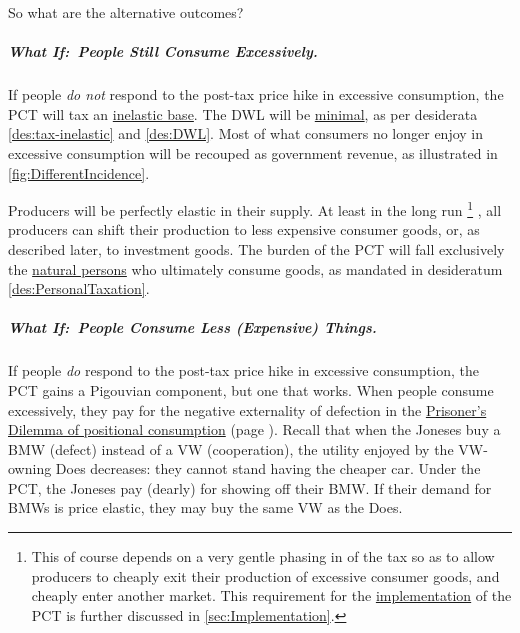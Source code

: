 So what are the alternative outcomes?

\subparagraph{What If:~People Still Consume Excessively.} If people \emph{do not} respond to the post-tax price hike in excessive consumption, the PCT will tax an \hyperref[des:tax-inelastic]{inelastic base}.
The DWL will be \hyperref[des:DWL]{minimal}, as per desiderata \ref{des:tax-inelastic} and \ref{des:DWL}.
Most of what consumers no longer enjoy in excessive consumption will be recouped as government revenue, as illustrated in \autoref{fig:DifferentIncidence}.

Producers will be perfectly elastic in their supply.
At least in the long run
\footnote{
	This of course depends on a very gentle phasing in of the tax so as to allow producers to cheaply exit their production of excessive consumer goods, and cheaply enter another market.
	This requirement for the \hyperref[sec:Implementation]{implementation} of the PCT is further discussed in \autoref{sec:Implementation}.
}
, all producers can shift their production to less expensive consumer goods, or, as described later, to investment goods.
The burden of the PCT will fall exclusively the \hyperref[des:PersonalTaxation]{natural persons} who ultimately consume goods, as mandated in desideratum \ref{des:PersonalTaxation}.

\subparagraph{What If:~People Consume Less (Expensive) Things.} If people \emph{do} respond to the post-tax price hike in excessive consumption, the PCT gains a Pigouvian component, but one that works.
When people consume excessively, they pay for the negative externality of defection in the \hyperref[tab:PositionalPD]{Prisoner's Dilemma of positional consumption} (page \pageref{tab:PositionalPD}).
Recall that when the Joneses buy a BMW (defect) instead of a VW (cooperation), the utility enjoyed by the VW-owning Does decreases:
they cannot stand having the cheaper car.
Under the PCT, the Joneses pay (dearly) for showing off their BMW.
If their demand for BMWs is price elastic, they may buy the same VW as the Does.

